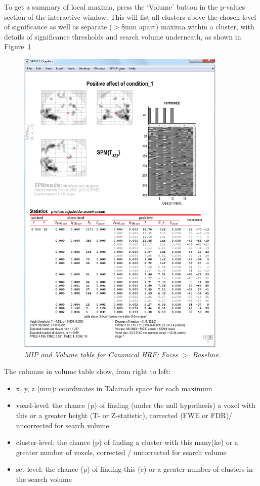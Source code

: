 \documentclass[a4paper,titlepage]{book}
\newcommand{\bi}{\begin{itemize}}
\newcommand{\ei}{\end{itemize}}
\begin{document}
To get a summary of local maxima, press the `Volume' button in the 
p-values section of the interactive window. This will list all clusters above the chosen level of significance as well as separate ($>$8mm apart) maxima within a cluster, with details of significance thresholds and search volume underneath, as shown in Figure~\ref{cat5_volume}
\begin{figure}
\begin{center}
\includegraphics[width=100mm]{cat5_volume}
\caption{\em MIP and Volume table for Canonical HRF: Faces  $>$ Baseline. \label{cat5_volume} }
\end{center}
\end{figure}
The columns in volume table show, from right to left:
\bi
\item{x, y, z (mm): coordinates in Talairach space for each maximum}
\item{voxel-level: the chance (p) of finding (under the null hypothesis) a voxel with this or a greater height (T- or Z-statistic), corrected (FWE or FDR)/ uncorrected for search volume.}
\item{cluster-level: the chance (p) of finding a cluster with this many(ke) or a greater number of voxels, corrected / uncorrected for search volume}
\item{set-level: the chance (p) of finding this (c) or a greater number of clusters in the search volume}
\ei
\end{document}
